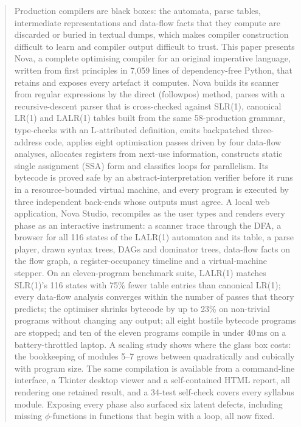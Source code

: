 \documentclass[conference]{IEEEtran}
\begin{document}
\begin{abstract}
Production compilers are black boxes: the automata, parse tables, intermediate representations and data-flow facts that they compute are discarded or buried in textual dumps, which makes compiler construction difficult to learn and compiler output difficult to trust. This paper presents Nova, a complete optimising compiler for an original imperative language, written from first principles in 7,059 lines of dependency-free Python, that retains and exposes every artefact it computes. Nova builds its scanner from regular expressions by the direct (followpos) method, parses with a recursive-descent parser that is cross-checked against SLR(1), canonical LR(1) and LALR(1) tables built from the same 58-production grammar, type-checks with an L-attributed definition, emits backpatched three-address code, applies eight optimisation passes driven by four data-flow analyses, allocates registers from next-use information, constructs static single assignment (SSA) form and classifies loops for parallelism. Its bytecode is proved safe by an abstract-interpretation verifier before it runs in a resource-bounded virtual machine, and every program is executed by three independent back-ends whose outputs must agree. A local web application, Nova Studio, recompiles as the user types and renders every phase as an interactive instrument: a scanner trace through the DFA, a browser for all 116 states of the LALR(1) automaton and its table, a parse player, drawn syntax trees, DAGs and dominator trees, data-flow facts on the flow graph, a register-occupancy timeline and a virtual-machine stepper. On an eleven-program benchmark suite, LALR(1) matches SLR(1)'s 116 states with 75\% fewer table entries than canonical LR(1); every data-flow analysis converges within the number of passes that theory predicts; the optimiser shrinks bytecode by up to 23\% on non-trivial programs without changing any output; all eight hostile bytecode programs are stopped; and ten of the eleven programs compile in under 40\,ms on a battery-throttled laptop. A scaling study shows where the glass box costs: the bookkeeping of modules 5--7 grows between quadratically and cubically with program size. The same compilation is available from a command-line interface, a Tkinter desktop viewer and a self-contained HTML report, all rendering one retained result, and a 34-test self-check covers every syllabus module. Exposing every phase also surfaced six latent defects, including missing $\phi$-functions in functions that begin with a loop, all now fixed.
\end{abstract}
\end{document}
